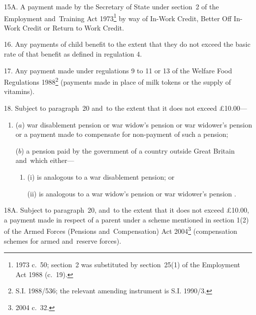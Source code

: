\documentclass[12pt,a4paper]{article}
\begin{document}
\medskip

15A.  A payment made by the Secretary of State under section~2 of the Employment and~Training Act 1973\footnote{1973 c.~50; section~2 was substituted by section~25(1) of the Employment Act 1988 (c.~19).} by way of In-Work Credit, Better Off In-Work Credit or Return to Work Credit.


\medskip

16.  Any payments of child benefit to the extent that they do not exceed the basic rate of that benefit as defined in regulation 4.

\medskip

17.  Any payment made under regulations 9 to 11 or 13 of the Welfare Food Regulations 1988\footnote{\frenchspacing S.I. 1988/536; the relevant amending instrument is S.I. 1990/3.} (payments made in place of milk tokens or the supply of vitamins).

\medskip

18.  Subject to paragraph~20 and~to the extent that it does not exceed £10$.$00—
\begin{enumerate}\item[]
($a$) war disablement pension or war widow’s pension 
or war widower's pension  %
or a payment made to compensate for non-payment of such a pension;

($b$) a pension paid by the government of a country outside Great Britain and~which either—
\begin{enumerate}\item[]
(i) is analogous to a war disablement pension; or

(ii) is analogous to a war widow’s pension
or war widower's pension%
.
\end{enumerate}
\end{enumerate}


\medskip

18A.  Subject to paragraph~20, and~to the extent that it does not exceed £10$.$00, a payment made in respect of a parent under a scheme mentioned in section 1(2) of the Armed Forces (Pensions and~Compensation) Act 2004\footnote{2004 c.\ 32.} (compensation schemes for armed and~reserve forces).
\end{document}
